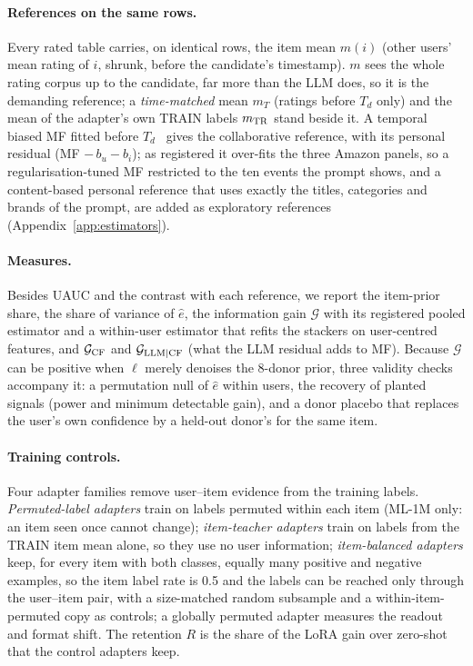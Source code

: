 \paragraph{References on the same rows.}
Every rated table carries, on identical rows, the item mean $m(i)$ (other users' mean rating of $i$, shrunk, before the candidate's
timestamp). $m$ sees the whole rating corpus up to the candidate, far more than the LLM does, so it is the demanding reference; a
\emph{time-matched} mean $m_T$ (ratings before $T_d$ only) and the mean of the adapter's own TRAIN labels $m_{\rm TR}$ stand beside it.
A temporal biased MF fitted before $T_d$~\citep{koren2009matrix} gives the collaborative reference, with its personal residual
(MF $-\,b_u-b_i$); as registered it over-fits the three Amazon panels, so a regularisation-tuned MF restricted to the ten events the
prompt shows, and a content-based personal reference that uses exactly the titles, categories and brands of the prompt, are added
as exploratory references (Appendix~\ref{app:estimators}).

\paragraph{Measures.}
Besides UAUC and the contrast with each reference, we report the item-prior share, the share of variance of $\hat e$, the
information gain $\mathcal G$ with its registered pooled estimator and a within-user estimator that refits the stackers on user-centred
features, and $\mathcal G_{\rm CF}$ and $\mathcal G_{\rm LLM|CF}$ (what the LLM residual adds to MF). Because $\mathcal G$ can be positive
when $\ell$ merely denoises the 8-donor prior, three validity checks accompany it: a permutation null of $\hat e$ within users, the
recovery of planted signals (power and minimum detectable gain), and a donor placebo that replaces the user's own confidence by a
held-out donor's for the same item.

\paragraph{Training controls.}
Four adapter families remove user--item evidence from the training labels. \emph{Permuted-label adapters} train on labels permuted within
each item (ML-1M only: an item seen once cannot change); \emph{item-teacher adapters} train on labels from the TRAIN item mean alone, so
they use no user information; \emph{item-balanced adapters} keep, for every item with both classes, equally many positive and negative
examples, so the item label rate is 0.5 and the labels can be reached only through the user--item pair, with a size-matched random
subsample and a within-item-permuted copy as controls; a globally permuted adapter measures the readout and format shift. The retention
$R$ is the share of the LoRA gain over zero-shot that the control adapters keep.

